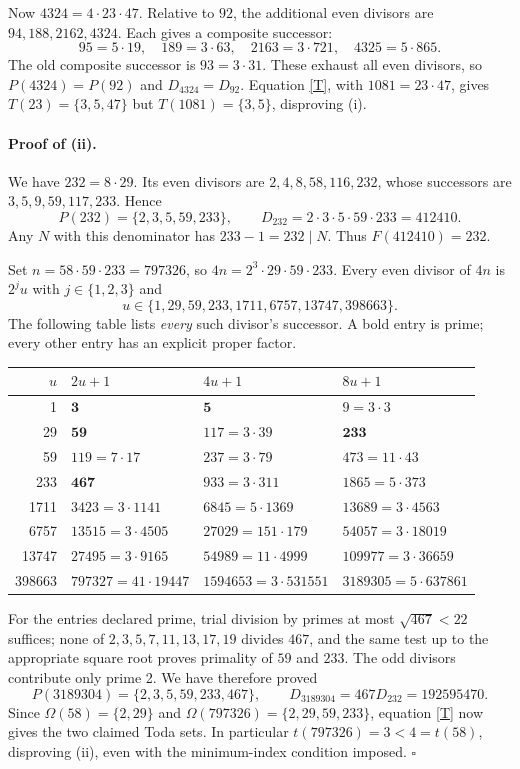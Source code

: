 \documentclass[11pt]{article}
\begin{document}
Now $4324=4\cdot23\cdot47$. Relative to $92$, the additional even
divisors are $94,188,2162,4324$. Each gives a composite successor:
\[
 95=5\cdot19,\quad 189=3\cdot63,\quad
 2163=3\cdot721,\quad 4325=5\cdot865.
\]
The old composite successor is $93=3\cdot31$. These exhaust all even
divisors, so $P(4324)=P(92)$ and $D_{4324}=D_{92}$.
Equation \eqref{T}, with $1081=23\cdot47$, gives
$T(23)=\{3,5,47\}$ but $T(1081)=\{3,5\}$, disproving (i).

\paragraph{Proof of (ii).}
We have $232=8\cdot29$. Its even divisors are
$2,4,8,58,116,232$, whose successors are
$3,5,9,59,117,233$. Hence
\[
 P(232)=\{2,3,5,59,233\},\qquad
 D_{232}=2\cdot3\cdot5\cdot59\cdot233=412410.
\]
Any $N$ with this denominator has $233-1=232\mid N$.
Thus $F(412410)=232$.

Set $n=58\cdot59\cdot233=797326$, so
$4n=2^3\cdot29\cdot59\cdot233$. Every even divisor of $4n$ is
$2^j u$ with $j\in\{1,2,3\}$ and
\[
 u\in\{1,29,59,233,1711,6757,13747,398663\}.
\]
The following table lists \emph{every} such divisor's successor.
A bold entry is prime; every other entry has an explicit proper factor.
\begin{center}
\small
\begin{tabular}{rlll}
\toprule
$u$ & $2u+1$ & $4u+1$ & $8u+1$\\
\midrule
1 & $\mathbf{3}$ & $\mathbf{5}$ & $9=3\cdot3$\\
29 & $\mathbf{59}$ & $117=3\cdot39$ & $\mathbf{233}$\\
59 & $119=7\cdot17$ & $237=3\cdot79$ & $473=11\cdot43$\\
233 & $\mathbf{467}$ & $933=3\cdot311$ & $1865=5\cdot373$\\
1711 & $3423=3\cdot1141$ & $6845=5\cdot1369$ & $13689=3\cdot4563$\\
6757 & $13515=3\cdot4505$ & $27029=151\cdot179$ & $54057=3\cdot18019$\\
13747 & $27495=3\cdot9165$ & $54989=11\cdot4999$ & $109977=3\cdot36659$\\
398663 & $797327=41\cdot19447$ & $1594653=3\cdot531551$ & $3189305=5\cdot637861$\\
\bottomrule
\end{tabular}
\end{center}
For the entries declared prime, trial division by primes at most
$\sqrt{467}<22$ suffices; none of $2,3,5,7,11,13,17,19$ divides
$467$, and the same test up to the appropriate square root proves
primality of $59$ and $233$. The odd divisors contribute only prime 2.
We have therefore proved
\[
 P(3189304)=\{2,3,5,59,233,467\},\qquad
 D_{3189304}=467D_{232}=192595470.
\]
Since $\Omega(58)=\{2,29\}$ and
$\Omega(797326)=\{2,29,59,233\}$, equation \eqref{T} now gives
the two claimed Toda sets. In particular $t(797326)=3<4=t(58)$,
disproving (ii), even with the minimum-index condition imposed.
\hfill$\square$
\end{document}

